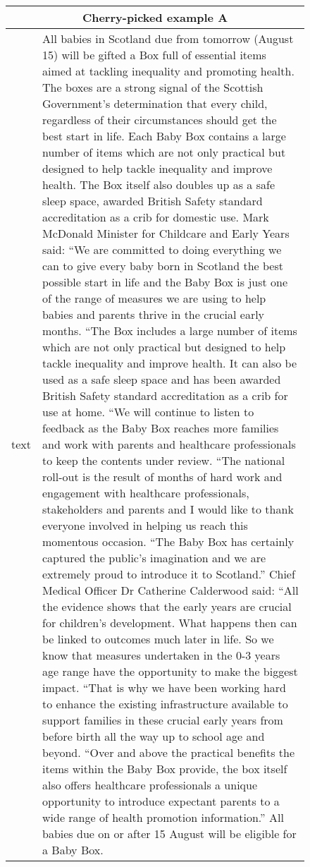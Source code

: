 \documentclass[11pt,a4paper]{article}
\begin{document}
\begin{figure*}[t]
    \centering
    \begin{adjustbox}{width=\textwidth}
    \begin{tabular}{|p{}|p{}|}
    \hline
    \multicolumn{2}{|c|}{\textbf{Cherry-picked example A}} \\
    \hline
    text & All babies in Scotland due from tomorrow (August 15) will be gifted a Box full of essential items aimed at tackling inequality and promoting health. The boxes are a strong signal of the Scottish Government’s determination that every child, regardless of their circumstances should get the best start in life. Each Baby Box contains a large number of items which are not only practical but designed to help tackle inequality and improve health. The Box itself also doubles up as a safe sleep space, awarded British Safety standard accreditation as a crib for domestic use. Mark McDonald Minister for Childcare and Early Years said: “We are committed to doing everything we can to give every baby born in Scotland the best possible start in life and the Baby Box is just one of the range of measures we are using to help babies and parents thrive in the crucial early months. “The Box includes a large number of items which are not only practical but designed to help tackle inequality and improve health. It can also be used as a safe sleep space and has been awarded British Safety standard accreditation as a crib for use at home. “We will continue to listen to feedback as the Baby Box reaches more families and work with parents and healthcare professionals to keep the contents under review. “The national roll-out is the result of months of hard work and engagement with healthcare professionals, stakeholders and parents and I would like to thank everyone involved in helping us reach this momentous occasion. “The Baby Box has certainly captured the public’s imagination and we are extremely proud to introduce it to Scotland.” Chief Medical Officer Dr Catherine Calderwood said: “All the evidence shows that the early years are crucial for children’s development. What happens then can be linked to outcomes much later in life. So we know that measures undertaken in the 0-3 years age range have the opportunity to make the biggest impact. “That is why we have been working hard to enhance the existing infrastructure available to support families in these crucial early years from before birth all the way up to school age and beyond. “Over and above the practical benefits the items within the Baby Box provide, the box itself also offers healthcare professionals a unique opportunity to introduce expectant parents to a wide range of health promotion information.” All babies due on or after 15 August will be eligible for a Baby Box.\\

\end{tabular}
\end{adjustbox}
\end{figure*}
\end{document}
